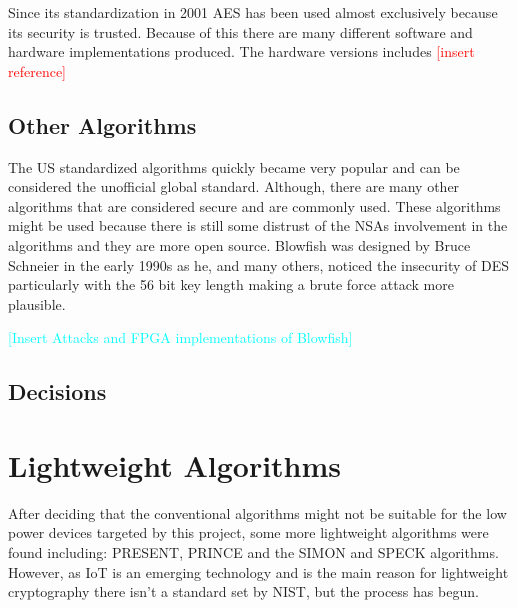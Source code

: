 \documentclass[12pt,twoside,a4paper]{report}
\begin{document}
    
    Since its standardization in 2001 AES has been used almost exclusively because its security is trusted. Because of this there are many different software and hardware implementations produced. The hardware versions includes \textcolor{red}{[insert reference]}   
    
    \subsection{Other Algorithms}
    The US standardized algorithms quickly became very popular and can be considered the unofficial global standard.
    Although, there are many other algorithms that are considered secure and are commonly used.
    These algorithms might be used because there is still some distrust of the NSAs involvement in the algorithms and they are more open source.
    Blowfish was designed by Bruce Schneier in the early 1990s as he, and many others, noticed the insecurity of DES particularly with the 56 bit key length making a brute force attack more plausible\cite{BruceSchneier1994}.
    
    \textcolor{cyan}{[Insert Attacks and FPGA implementations of Blowfish]}
    
    \subsection{Decisions}
    
    \section{Lightweight Algorithms}
    After deciding that the conventional algorithms might not be suitable for the low power devices targeted by this project, some more lightweight algorithms were found including: PRESENT, PRINCE and the SIMON and SPECK algorithms\cite{Beaulieu2015}. However, as IoT is an emerging technology and is the main reason for lightweight cryptography there isn't a standard set by NIST, but the process has begun\cite{Mckay}.
    
\end{document}
